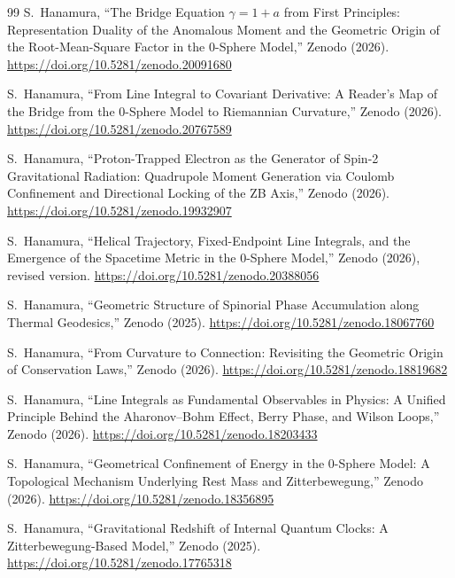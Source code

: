 \documentclass[%
 reprint, amsmath,amssymb, aps, prb, ]{revtex4-2}
\numberwithin{equation}{section}
\begin{document}
\begin{thebibliography}{99}
 S.~Hanamura, ``The Bridge Equation $\gamma = 1 + a$ from First Principles: Representation Duality of the Anomalous Moment and the Geometric Origin of the Root-Mean-Square Factor in the 0-Sphere Model,'' Zenodo (2026). \href{https://doi.org/10.5281/zenodo.20091680}{https://doi.org/10.5281/zenodo.20091680}

 S.~Hanamura, ``From Line Integral to Covariant Derivative: A Reader's Map of the Bridge from the 0-Sphere Model to Riemannian Curvature,'' Zenodo (2026). \href{https://doi.org/10.5281/zenodo.20767589}{https://doi.org/10.5281/zenodo.20767589}

 S.~Hanamura, ``Proton-Trapped Electron as the Generator of Spin-2 Gravitational Radiation: Quadrupole Moment Generation via Coulomb Confinement and Directional Locking of the ZB Axis,'' Zenodo (2026). \href{https://doi.org/10.5281/zenodo.19932907}{https://doi.org/10.5281/zenodo.19932907}

 S.~Hanamura, ``Helical Trajectory, Fixed-Endpoint Line Integrals, and the Emergence of the Spacetime Metric in the 0-Sphere Model,'' Zenodo (2026), revised version. \href{https://doi.org/10.5281/zenodo.20388056}{https://doi.org/10.5281/zenodo.20388056}

 S.~Hanamura, ``Geometric Structure of Spinorial Phase Accumulation along Thermal Geodesics,'' Zenodo (2025). \href{https://doi.org/10.5281/zenodo.18067760}{https://doi.org/10.5281/zenodo.18067760}

 S.~Hanamura, ``From Curvature to Connection: Revisiting the Geometric Origin of Conservation Laws,'' Zenodo (2026). \href{https://doi.org/10.5281/zenodo.18819682}{https://doi.org/10.5281/zenodo.18819682}

 S.~Hanamura, ``Line Integrals as Fundamental Observables in Physics: A Unified Principle Behind the Aharonov--Bohm Effect, Berry Phase, and Wilson Loops,'' Zenodo (2026). \href{https://doi.org/10.5281/zenodo.18203433}{https://doi.org/10.5281/zenodo.18203433}

 S.~Hanamura, ``Geometrical Confinement of Energy in the 0-Sphere Model: A Topological Mechanism Underlying Rest Mass and Zitterbewegung,'' Zenodo (2026). \href{https://doi.org/10.5281/zenodo.18356895}{https://doi.org/10.5281/zenodo.18356895}

 S.~Hanamura, ``Gravitational Redshift of Internal Quantum Clocks: A Zitterbewegung-Based Model,'' Zenodo (2025). \href{https://doi.org/10.5281/zenodo.17765318}{https://doi.org/10.5281/zenodo.17765318}


\end{thebibliography}
\end{document}
